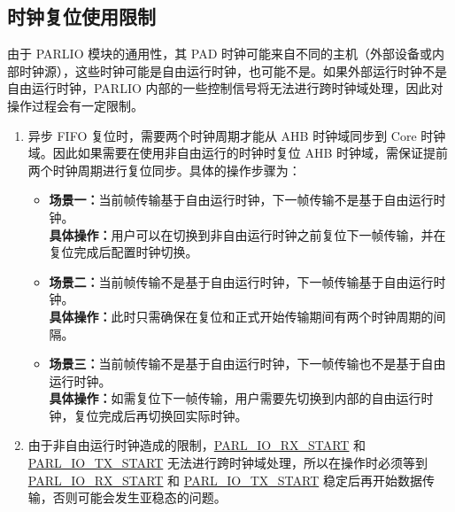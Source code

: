 \documentclass[main\_\_CN.tex]{subfiles}
\begin{document}
\subsection{时钟复位使用限制}
\label{subsec:parlio-clock_reset_restriction}

由于 PARLIO 模块的通用性，其 PAD 时钟可能来自不同的主机（外部设备或内部时钟源），这些时钟可能是自由运行时钟，也可能不是。如果外部运行时钟不是自由运行时钟，PARLIO 内部的一些控制信号将无法进行跨时钟域处理，因此对操作过程会有一定限制。

\begin{enumerate}
    \item 异步 FIFO 复位时，需要两个时钟周期才能从 AHB 时钟域同步到 Core 时钟域。因此如果需要在使用非自由运行的时钟时复位 AHB 时钟域，需保证提前两个时钟周期进行复位同步。具体的操作步骤为：
    \begin{itemize}
        \item \textbf{场景一：}当前帧传输基于自由运行时钟，下一帧传输不是基于自由运行时钟。\\
        \textbf{具体操作：}用户可以在切换到非自由运行时钟之前复位下一帧传输，并在复位完成后配置时钟切换。
        \item \textbf{场景二：}当前帧传输不是基于自由运行时钟，下一帧传输基于自由运行时钟。\\
        \textbf{具体操作：}此时只需确保在复位和正式开始传输期间有两个时钟周期的间隔。
        \item \textbf{场景三：}当前帧传输不是基于自由运行时钟，下一帧传输也不是基于自由运行时钟。\\
        \textbf{具体操作：}如需复位下一帧传输，用户需要先切换到内部的自由运行时钟，复位完成后再切换回实际时钟。
    \end{itemize}
    
    \item 由于非自由运行时钟造成的限制，\hyperref[fielddesc:PARLIORXSTART]{PARL\_IO\_RX\_START} 和 \hyperref[fielddesc:PARLIOTXSTART]{PARL\_IO\_TX\_START} 无法进行跨时钟域处理，所以在操作时必须等到 \hyperref[fielddesc:PARLIORXSTART]{PARL\_IO\_RX\_START} 和 \hyperref[fielddesc:PARLIOTXSTART]{PARL\_IO\_TX\_START} 稳定后再开始数据传输，否则可能会发生亚稳态的问题。
    

\end{enumerate}
\end{document}
